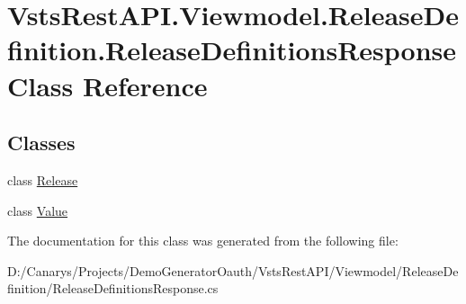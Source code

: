 \hypertarget{class_vsts_rest_a_p_i_1_1_viewmodel_1_1_release_definition_1_1_release_definitions_response}{}\section{Vsts\+Rest\+A\+P\+I.\+Viewmodel.\+Release\+Definition.\+Release\+Definitions\+Response Class Reference}
\label{class_vsts_rest_a_p_i_1_1_viewmodel_1_1_release_definition_1_1_release_definitions_response}
\subsection*{Classes}
\begin{DoxyCompactItemize}
\item 
class \mbox{\hyperlink{class_vsts_rest_a_p_i_1_1_viewmodel_1_1_release_definition_1_1_release_definitions_response_1_1_release}{Release}}
\item 
class \mbox{\hyperlink{class_vsts_rest_a_p_i_1_1_viewmodel_1_1_release_definition_1_1_release_definitions_response_1_1_value}{Value}}
\end{DoxyCompactItemize}


The documentation for this class was generated from the following file\+:\begin{DoxyCompactItemize}
\item 
D\+:/\+Canarys/\+Projects/\+Demo\+Generator\+Oauth/\+Vsts\+Rest\+A\+P\+I/\+Viewmodel/\+Release\+Definition/Release\+Definitions\+Response.\+cs\end{DoxyCompactItemize}

